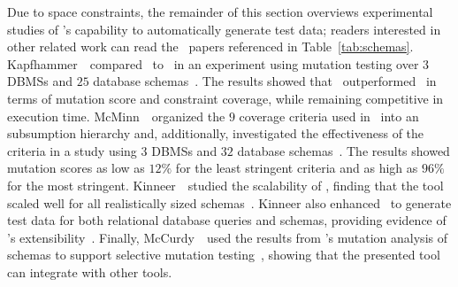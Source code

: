 Due to space constraints, the remainder of this section overviews experimental studies of \sa's capability to
automatically generate test data; readers interested in other related work can read the \numuniquepapers~papers
referenced in Table~\ref{tab:schemas}.  Kapfhammer~\etal~compared \sa~to \dbmonster~in an experiment using mutation
testing over $3$ DBMSs and $25$ database schemas~\cite{kapfhammer2013search}. The results showed that \sa~outperformed
\dbmonster~in terms of mutation score and constraint coverage, while remaining competitive in execution time.
McMinn~\etal~organized the $9$ coverage criteria used in \sa~into an subsumption hierarchy and, additionally,
investigated the effectiveness of the criteria in a study using $3$ DBMSs and $32$ database
schemas~\cite{mcminn2015effectiveness}. The results showed mutation scores as low as $12\%$ for the least stringent
criteria and as high as $96\%$ for the most stringent. Kinneer~\etal~studied the scalability of \sa, finding that the
tool scaled well for all realistically sized schemas~\cite{kinneer2015automatically, Kinneer2015a}. Kinneer also
enhanced \sa~to generate test data for both relational database queries and schemas, providing evidence of \sa's
extensibility~\cite{kinneer2016comp}. Finally, McCurdy~\etal~used the results from \sa's mutation analysis of schemas to
support selective mutation testing~\cite{McCurdy2016}, showing that the presented tool can integrate with other tools.






